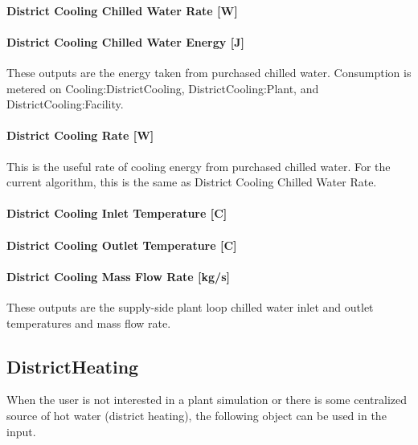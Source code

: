 \paragraph{District Cooling Chilled Water Rate {[}W{]}}\label{district-cooling-chilled-water-rate-w}

\paragraph{District Cooling Chilled Water Energy {[}J{]}}\label{district-cooling-chilled-water-energy-j}

These outputs are the energy taken from purchased chilled water. Consumption is metered on Cooling:DistrictCooling, DistrictCooling:Plant, and DistrictCooling:Facility.

\paragraph{District Cooling Rate {[}W{]}}\label{district-cooling-rate-w}

This is the useful rate of cooling energy from purchased chilled water. For the current algorithm, this is the same as District Cooling Chilled Water Rate.

\paragraph{District Cooling Inlet Temperature {[}C{]}}\label{district-cooling-inlet-temperature-c}

\paragraph{District Cooling Outlet Temperature {[}C{]}}\label{district-cooling-outlet-temperature-c}

\paragraph{District Cooling Mass Flow Rate {[}kg/s{]}}\label{district-cooling-mass-flow-rate-kgs}

These outputs are the supply-side plant loop chilled water inlet and outlet temperatures and mass flow rate.

\subsection{DistrictHeating}\label{districtheating}

When the user is not interested in a plant simulation or there is some centralized source of hot water (district heating), the following object can be used in the input.

